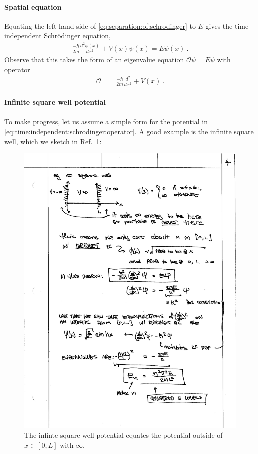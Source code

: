 \paragraph{Spatial equation} Equating the left-hand side of \eqref{eq:separation:of:schrodinger} to $E$ gives the time-independent Schr\"odinger equation,
\begin{align}
    \frac{-\hbar}{2m}\frac{d^2\psi(x)}{dx^2} + V(x)\psi(x) = E\psi(x) \ .
\end{align}
Observe that this takes the form of an eigenvalue equation $\mathcal O \psi = E \psi$ with operator
\begin{align}
    \mathcal O &= \frac{-\hbar}{2m}\frac{d^2}{dx^2} + V(x)
    \label{eq:time:independent:schrodinger:operator} \ .
\end{align}

\paragraph{Infinite square well potential} To make progress, let us assume a simple form for the potential in \eqref{eq:time:independent:schrodinger:operator}. 
A good example is the infinite square well, which we sketch in Ref.~\ref{fig:inf:well}:
\begin{figure}[tb]
    \centering
    \includegraphics[width=.8\textwidth]{figures/inf_sq_well.pdf}
    \caption{The infinte square well potential equates the potential outside of $x\in[0,L]$ with $\infty$.}
    \label{fig:inf:well}
\end{figure}
